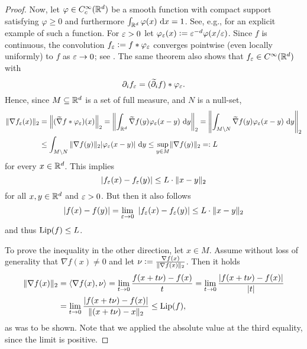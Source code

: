\begin{proof}
Now, let $\varphi \in C_c^\infty (\mathbb{R}^d)$ be a smooth function with compact support satisfying $\varphi \geq 0$ and furthermore $\int_{\mathbb{R}^d} \varphi(x) \ \mathrm{d} x = 1$. See, e.g., \cite[Section~4.2.1]{evans_measure_1992} for an explicit example of such a function. For $\varepsilon > 0$ let $\varphi_\varepsilon (x) \mathrel{\mathop:}= \varepsilon^{-d} \varphi(x / \varepsilon)$. Since $f$ is continuous, the convolution $f_\varepsilon \mathrel{\mathop:}= f \ast \varphi_\varepsilon$ converges pointwise (even locally uniformly) to $f$ as $\varepsilon \to 0$; see \cite[Theorem~1~in~Section~4.2]{evans_measure_1992}. The same theorem also shows that $f_\varepsilon \in C^\infty (\mathbb{R}^d)$ with 
\begin{equation*}
\partial_i f_\varepsilon = (\widetilde{\partial}_i f) \ast \varphi_\varepsilon.
\end{equation*}
Hence, since $M \subseteq \mathbb{R}^d$ is a set of full measure, and $N$ is a null-set,
\begin{align*}
\Vert \nabla f_\varepsilon (x) \Vert_2 &= \left\Vert (\widetilde{\nabla}f \ast \varphi_\varepsilon)(x)\right\Vert_2 = \left\Vert \int_{\mathbb{R}^d} \widetilde{\nabla} f (y) \varphi_\varepsilon (x-y)\ \mathrm{d} y\right\Vert_2 = \left\Vert \int_{M \setminus N} \widetilde{\nabla} f (y) \varphi_\varepsilon (x-y)\ \mathrm{d} y\right\Vert_2 \\
&\leq \int_{M \setminus N} \Vert \nabla f (y)\Vert_2 \vert \varphi_\varepsilon (x-y)\vert\ \mathrm{d} y \leq \underset{y \in M }{\sup} \Vert \nabla f(y)\Vert_2 =: L
\end{align*}
for every $x \in \mathbb{R}^d$. This implies 
\begin{equation*}
\left\vert f_\varepsilon(x) - f_\varepsilon(y)\right\vert \leq L \cdot \Vert x-y \Vert_2
\end{equation*}
for all $x,y \in \mathbb{R}^d$ and $\varepsilon > 0$. But then it also follows
\begin{equation*}
\vert f(x) - f(y) \vert = \lim_{\eps \to 0} \ \vert f_\eps(x) -f_\eps(y)\vert \leq L \cdot \Vert x-y \Vert_2
\end{equation*}
and thus $\operatorname{Lip}(f) \leq L$.

To prove the inequality in the other direction, let $x \in M$. Assume without loss of generality that $\nabla f (x) \neq 0$ and let $\nu \mathrel{\mathop:}= \frac{\nabla f (x)}{\Vert \nabla f (x) \Vert_2}$. Then it holds
\begin{align*}
\Vert \nabla f (x) \Vert_2 &= \langle \nabla f (x), \nu\rangle= \lim_{t \to 0} \frac{ f(x+t\nu) - f(x)}{ t}= \lim_{t \to 0} \frac{\vert f(x+t\nu) - f(x)\vert}{\vert t \vert} \\
&=  \lim_{t \to 0} \frac{\vert f(x+t\nu) - f(x)\vert}{\Vert (x + t\nu) - x \Vert_2} \leq \operatorname{Lip}(f),
\end{align*}
as was to be shown. Note that we applied the absolute value at the third equality, since the limit is positive. 
\end{proof}

